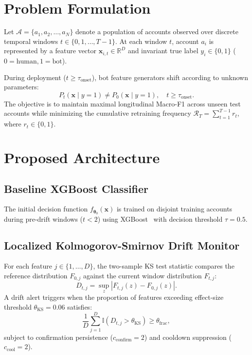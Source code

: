 \documentclass[journal]{IEEEtran}
\begin{document}
\section{Problem Formulation}
Let $\mathcal{A} = \{a_1, a_2, \dots, a_N\}$ denote a population of accounts observed over discrete temporal windows $t \in \{0, 1, \dots, T-1\}$. At each window $t$, account $a_i$ is represented by a feature vector $\mathbf{x}_{i,t} \in \mathbb{R}^D$ and invariant true label $y_i \in \{0, 1\}$ ($0 = \text{human}, 1 = \text{bot}$). 

During deployment ($t \ge \tau_{\text{onset}}$), bot feature generators shift according to unknown parameters:
\begin{equation}
P_t(\mathbf{x} \mid y=1) \neq P_0(\mathbf{x} \mid y=1), \quad t \ge \tau_{\text{onset}}.
\end{equation}
The objective is to maintain maximal longitudinal Macro-F1 across unseen test accounts while minimizing the cumulative retraining frequency $\mathcal{R}_T = \sum_{t=1}^{T-1} r_t$, where $r_t \in \{0, 1\}$.

\section{Proposed Architecture}
\subsection{Baseline XGBoost Classifier}
The initial decision function $f_{\boldsymbol{\theta}_0}(\mathbf{x})$ is trained on disjoint training accounts during pre-drift windows ($t < 2$) using XGBoost~\cite{chen2016xgboost} with decision threshold $\tau = 0.5$.

\subsection{Localized Kolmogorov-Smirnov Drift Monitor}
For each feature $j \in \{1, \dots, D\}$, the two-sample KS test statistic compares the reference distribution $F_{0,j}$ against the current window distribution $F_{t,j}$:
\begin{equation}
D_{t,j} = \sup_{z} \left| F_{t,j}(z) - F_{0,j}(z) \right|.
\end{equation}
A drift alert triggers when the proportion of features exceeding effect-size threshold $\theta_{\text{KS}} = 0.06$ satisfies:
\begin{equation}
\frac{1}{D} \sum_{j=1}^D \mathbb{I}\left(D_{t,j} > \theta_{\text{KS}}\right) \ge \theta_{\text{frac}},
\end{equation}
subject to confirmation persistence ($c_{\text{confirm}} = 2$) and cooldown suppression ($c_{\text{cool}} = 2$).
\end{document}
